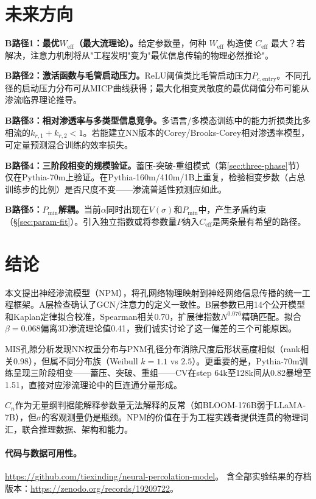 \documentclass[11pt,a4paper]{article}
\newcommand{\Weff}{W_{\text{eff}}}
\newcommand{\Ceff}{C_{\text{eff}}}
\begin{document}
\section{未来方向}
\label{sec:future}

\textbf{B路径1：最优$\Weff$（最大流理论）。}给定参数量，何种 $\Weff$ 构造使 $\Ceff$ 最大？若解决，注意力机制将从"工程发明"变为"最优信息传输的物理必然推论"。

\textbf{B路径2：激活函数与毛管启动压力。}ReLU阈值类比毛管启动压力$P_{c,\text{entry}}$。不同孔径的启动压力分布可从MICP曲线获得；最大化相变灵敏度的最优阈值分布可能从渗流临界理论推导。

\textbf{B路径3：相对渗透率与多类型信息竞争。}多语言/多模态训练中的能力折损类比多相流的$k_{r,1}+k_{r,2}<1$。若能建立NN版本的Corey/Brooks-Corey相对渗透率模型，可定量预测混合训练的效率损失。

\textbf{B路径4：三阶段相变的规模验证。}蓄压-突破-重组模式（第\ref{sec:three-phase}节）仅在Pythia-70m上验证。在Pythia-160m/410m/1B上重复，检验相变步数（占总训练步的比例）是否尺度不变——渗流普适性预测应如此。

\textbf{B路径5：$P_{\min}$解耦。}当前$\alpha$同时出现在$V(\sigma)$和$P_{\min}$中，产生矛盾约束（\S\ref{sec:param-fit}）。引入独立指数或将参数量$P$纳入$\Ceff$是两条最有希望的路径。

\section{结论}

本文提出神经渗流模型（NPM），将孔网络物理映射到神经网络信息传播的统一工程框架。A层检查确认了GCN/注意力的定义一致性。B层参数已用14个公开模型和Kaplan定律拟合校准，Spearman相关0.70，扩展律指数$N^{0.076}$精确匹配。拟合$\beta=0.068$偏离3D渗流理论值0.41，我们诚实讨论了这一偏差的三个可能原因。

MIS孔隙分析发现NN权重分布与PNM孔径分布消除尺度后形状高度相似（rank相关0.98），但属不同分布族（Weibull $k=1.1$ vs $2.5$）。更重要的是，Pythia-70m训练呈现三阶段相变——蓄压、突破、重组——CV在step 64k至128k间从0.82暴增至1.51，直接对应渗流理论中的巨连通分量形成。

$C_n$作为无量纲判据能解释参数量无法解释的反常（如BLOOM-176B弱于LLaMA-7B），但$\sigma$的客观测量仍是瓶颈。NPM的价值在于为工程实践者提供连贯的物理词汇，联合推理数据、架构和能力。

\paragraph{代码与数据可用性。}
\url{https://github.com/tiexinding/neural-percolation-model}。
含全部实验结果的存档版本：\url{https://zenodo.org/records/19209722}。
\end{document}
